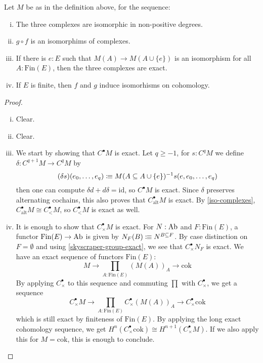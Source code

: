 \begin{lemma}
  \label{ordered-cech-equivalence}
  Let $M$ be as in the definition above, for the sequence:
  \begin{center}
  \end{center}
  \begin{enumerate}[(i)]
  \item The three complexes are isomorphic in non-positive degrees.
  \item\label{iso-complexes} $g\circ f$ is an isomorphims of complexes.
  \item\label{skyscraper-group-exact} If there is $e:E$ such that $M(A)\to M(A\cup \{e\})$ is an isomorphism for all $A:\mathrm{Fin}(E)$,
    then the three complexes are exact.
  \item\label{finite-ordered-cech} If $E$ is finite, then $f$ and $g$ induce isomorhisms on cohomology.
  \end{enumerate}
\end{lemma}

\begin{proof}
  \begin{enumerate}[(i)]
  \item Clear.
  \item Clear.
  \item We start by showing that $C^\bullet M$ is exact.
    Let $q\geq -1$, for $s:C^q M$ we define $\delta:C^{q+1}M\to C^q M$ by
    \[
      (\delta s)(e_0,\dots,e_q)\vcentcolon\mspace{-1.2mu}\equiv M(A\subseteq A\cup\{e\})^{-1} s(e,e_0,\dots,e_q)
    \]
    then one can compute $\delta d+d\delta=\mathrm{id}$, so $C^\bullet M$ is exact.
    Since $\delta$ preserves alternating cochains, this also proves that $C_{\mathrm{alt}}^\bullet M$ is exact.
    By \ref{iso-complexes}, $C_{\mathrm{alt}}^\bullet M\cong C_<^\bullet M$, so $C_<^\bullet M$ is exact as well.
  \item It is enough to show that $C_\times^\bullet M$ is exact.
    For $N:\operatorname{Ab}$ and $F:\mathrm{Fin}(E)$, a functor $\mathrm{Fin}(E)\to \operatorname{Ab}$ is given by $N_F(B)\vcentcolon\mspace{-1.2mu}\equiv N^{B\subseteq F}$.
    By case distinction on $F=\emptyset$ and using \ref{skyscraper-group-exact}, we see that $C_\times^\bullet N_F$ is exact.
    We have an exact sequence of functors $\mathrm{Fin}(E)$:
    \[
      M\to \prod_{A:\mathrm{Fin}(E)}(M(A))_A\to \mathrm{cok}
    \]
    By applying $C_\times^\bullet$ to this sequence and commuting $\prod$ with $C_\times^\bullet$,
    we get a sequence
    \[
      C_\times^\bullet M\to \prod_{A:\mathrm{Fin}(E)}C_\times^\bullet (M(A))_A\to C_\times^\bullet \mathrm{cok}
    \]
    which is still exact by finiteness of $\mathrm{Fin}(E)$.
    By applying the long exact cohomology sequence, we get $H^n(C_\times^\bullet \mathrm{cok})\cong H^{n+1}(C_\times^\bullet M)$.
    If we also apply this for $M=\mathrm{cok}$, this is enough to conclude.
  \end{enumerate}
\end{proof}

